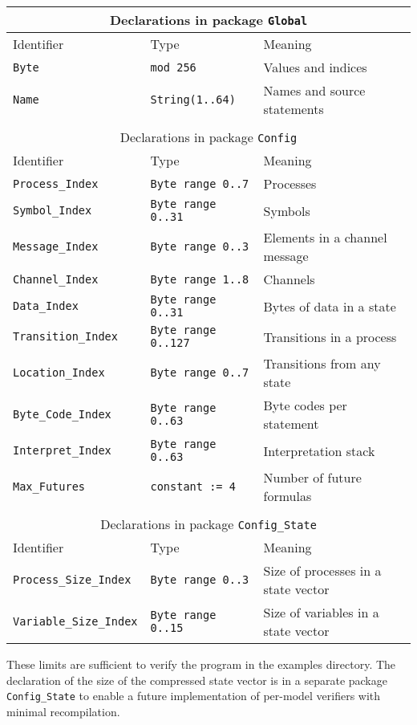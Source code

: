 \documentclass[11pt]{article}
\newcommand*{\p}[1]{\texttt{#1}}
\begin{document}
\begin{center}
\begin{tabular}{|l|l|l|}\hline
\multicolumn{3}{|c|}{Declarations in package \p{Global}}\\\hline
Identifier & Type & Meaning\\\hline\hline
\p{Byte} & \p{mod 256} & Values and indices\\\hline
\p{Name} & \p{String(1..64)} & Names and source statements\\\hline
\multicolumn{3}{c}{}\\\hline
\multicolumn{3}{|c|}{Declarations in package \p{Config}}\\\hline
Identifier & Type & Meaning\\\hline\hline
\p{Process\_Index} & \p{Byte range 0..7} & Processes\\\hline
\p{Symbol\_Index} & \p{Byte range 0..31} & Symbols\\\hline
\p{Message\_Index} & \p{Byte range 0..3} & Elements in a channel message\\\hline
\p{Channel\_Index} & \p{Byte range 1..8} & Channels\\\hline
\p{Data\_Index} & \p{Byte range 0..31} & Bytes of data in a state\\\hline
\p{Transition\_Index} & \p{Byte range 0..127} & Transitions in a process\\\hline
\p{Location\_Index} & \p{Byte range 0..7} & Transitions from any state\\\hline
\p{Byte\_Code\_Index} & \p{Byte range 0..63} & Byte codes per statement\\\hline
\p{Interpret\_Index} & \p{Byte range 0..63} & Interpretation stack\\\hline
\p{Max\_Futures} & \p{constant := 4} & Number of future formulas\\\hline
\multicolumn{3}{c}{}\\\hline
\multicolumn{3}{|c|}{Declarations in package \p{Config\_State}}\\\hline
Identifier & Type & Meaning\\\hline\hline
\p{Process\_Size\_Index} & \p{Byte range 0..3} & Size of processes in a state vector\\\hline
\p{Variable\_Size\_Index} & \p{Byte range 0..15} & Size of variables in a state vector\\\hline
\end{tabular}
\end{center}
These limits are sufficient to verify the program in the examples
directory. The declaration of the size of the compressed state vector is
in a separate package \p{Config\_State} to enable a future
implementation of per-model verifiers with minimal recompilation.
\end{document}
